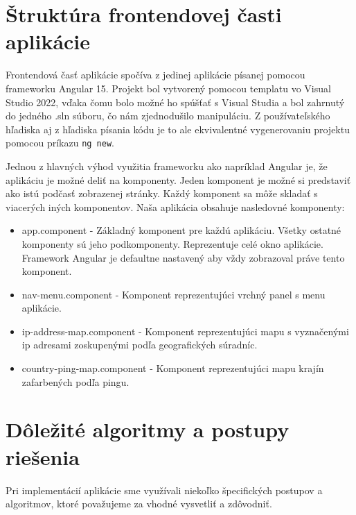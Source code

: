 \section{Štruktúra frontendovej časti aplikácie}
Frontendová časť aplikácie spočíva z jedinej aplikácie písanej pomocou frameworku Angular 15. Projekt bol vytvorený pomocou templatu vo Visual Studio 2022, vďaka čomu bolo možné ho 
spúšťať s Visual Studia a bol zahrnutý do jedného .sln súboru, čo nám zjednodušilo manipuláciu. Z používateľského hľadiska aj z hľadiska písania kódu je to ale ekvivalentné 
vygenerovaniu projektu pomocou príkazu \lstinline{ng new}.

Jednou z hlavných výhod využitia frameworku ako napríklad Angular je, že aplikáciu je možné deliť na komponenty. Jeden komponent je možné si predstaviť ako istú podčasť zobrazenej stránky. 
Každý komponent sa môže skladať s viacerých iných komponentov. Naša aplikácia obsahuje nasledovné komponenty:
\begin{itemize}
    \item app.component
    - Základný komponent pre každú aplikáciu. Všetky ostatné komponenty sú jeho podkomponenty. Reprezentuje celé okno aplikácie. Framework Angular je defaultne nastavený aby vždy 
    zobrazoval práve tento komponent. 
    \item nav-menu.component
    - Komponent reprezentujúci vrchný panel s menu aplikácie.
    \item ip-address-map.component
    - Komponent reprezentujúci mapu s vyznačenými ip adresami zoskupenými podľa geografických súradníc.
    \item country-ping-map.component 
    - Komponent reprezentujúci mapu krajín zafarbených podľa pingu.
\end{itemize}

\section{Dôležité algoritmy a postupy riešenia}
\label{postupy}

Pri implementácií aplikácie sme využívali niekoľko špecifických postupov a algoritmov, ktoré považujeme za vhodné vysvetliť a zdôvodniť. 

